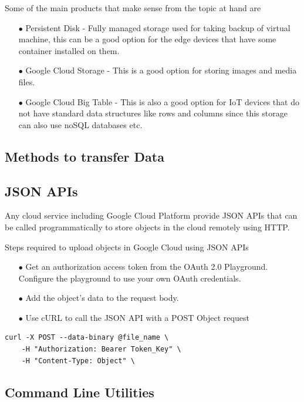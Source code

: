 Some of the main products that make sense from the topic at hand are

\begin{itemize}
\item[$\bullet$] Persistent Disk - Fully managed storage used for taking backup of virtual machine, this can be a good option for the edge devices that have some container installed on them.
\item[$\bullet$] Google Cloud Storage - This is a good option for storing images and media files.
\item[$\bullet$] Google Cloud Big Table - This is also a good option for IoT devices that do not have standard data structures like rows and columns since this storage can also use noSQL databases etc.
\end{itemize} 

\subsection{Methods to transfer Data}

\subsection{JSON APIs}
Any cloud service including Google Cloud Platform provide JSON APIs that can be called programmatically to store objects in the cloud remotely using HTTP.

Steps required to upload objects in Google Cloud using JSON APIs
\begin{itemize}
\item[$\bullet$] Get an authorization access token from the OAuth 2.0 Playground. Configure the playground to use your own OAuth credentials.
\item[$\bullet$] Add the object's data to the request body.
\item[$\bullet$] Use cURL to call the JSON API with a POST Object request
\end{itemize} 

\begin{verbatim}
curl -X POST --data-binary @file_name \
    -H "Authorization: Bearer Token_Key" \
    -H "Content-Type: Object" \
\end{verbatim}

\subsection{Command Line Utilities}

